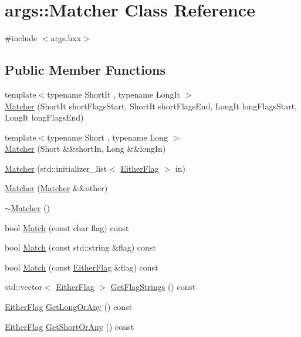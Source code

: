 \hypertarget{classargs_1_1_matcher}{}\section{args\+:\+:Matcher Class Reference}
\label{classargs_1_1_matcher}


{\ttfamily \#include $<$args.\+hxx$>$}

\subsection*{Public Member Functions}
\begin{DoxyCompactItemize}
\item 
{\footnotesize template$<$typename Short\+It , typename Long\+It $>$ }\\\hyperlink{classargs_1_1_matcher_a87fc200d9a51b3be654e0ec551304ec5}{Matcher} (Short\+It short\+Flags\+Start, Short\+It short\+Flags\+End, Long\+It long\+Flags\+Start, Long\+It long\+Flags\+End)
\item 
{\footnotesize template$<$typename Short , typename Long $>$ }\\\hyperlink{classargs_1_1_matcher_a62cfbb3db70f623153f8317abb5421dc}{Matcher} (Short \&\&short\+In, Long \&\&long\+In)
\item 
\hyperlink{classargs_1_1_matcher_ad70f96e5475d9020773b429e9f79cb2d}{Matcher} (std\+::initializer\+\_\+list$<$ \hyperlink{structargs_1_1_either_flag}{Either\+Flag} $>$ in)
\item 
\hyperlink{classargs_1_1_matcher_a29ef34a8f70f00dfb52c9d5d15886625}{Matcher} (\hyperlink{classargs_1_1_matcher}{Matcher} \&\&other)
\item 
\hyperlink{classargs_1_1_matcher_acb9ecd5c9f54e07e5457dcabbfb8d9cd}{$\sim$\+Matcher} ()
\item 
bool \hyperlink{classargs_1_1_matcher_ac0109d749d161b039d879e2c6b4b708c}{Match} (const char flag) const
\item 
bool \hyperlink{classargs_1_1_matcher_aa61c6a4d756752ec692c0b703035608a}{Match} (const std\+::string \&flag) const
\item 
bool \hyperlink{classargs_1_1_matcher_ad657c9f5cca2892863c71bb980ea94e2}{Match} (const \hyperlink{structargs_1_1_either_flag}{Either\+Flag} \&flag) const
\item 
std\+::vector$<$ \hyperlink{structargs_1_1_either_flag}{Either\+Flag} $>$ \hyperlink{classargs_1_1_matcher_a3b90feb46bb0d504072344e8bced8cd5}{Get\+Flag\+Strings} () const
\item 
\hyperlink{structargs_1_1_either_flag}{Either\+Flag} \hyperlink{classargs_1_1_matcher_ab3668d21d135ca54f966b935a5251836}{Get\+Long\+Or\+Any} () const
\item 
\hyperlink{structargs_1_1_either_flag}{Either\+Flag} \hyperlink{classargs_1_1_matcher_a41ff39211bfb881c95b69b9d4e1e3b00}{Get\+Short\+Or\+Any} () const
\end{DoxyCompactItemize}


